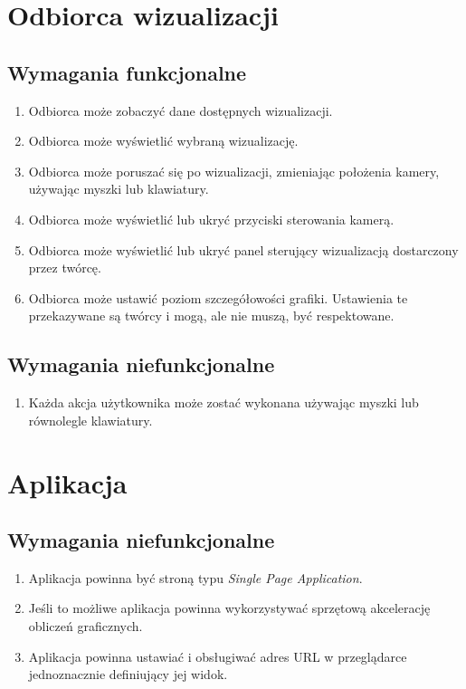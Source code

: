 \section{Odbiorca wizualizacji}

\subsection{Wymagania funkcjonalne}
\begin{enumerate}
    \item Odbiorca może zobaczyć dane dostępnych wizualizacji.
    \item Odbiorca może wyświetlić wybraną wizualizację.
    \item Odbiorca może poruszać się po wizualizacji, zmieniając położenia kamery, używając myszki lub klawiatury.
    \item Odbiorca może wyświetlić lub ukryć przyciski sterowania kamerą.
    \item Odbiorca może wyświetlić lub ukryć panel sterujący wizualizacją dostarczony przez twórcę.
    \item Odbiorca może ustawić poziom szczegółowości grafiki. Ustawienia te przekazywane są twórcy i mogą, ale nie muszą, być respektowane.
\end{enumerate}
\subsection{Wymagania niefunkcjonalne}
\begin{enumerate}
    \item Każda akcja użytkownika może zostać wykonana używając myszki lub równolegle klawiatury.
\end{enumerate}

\section{Aplikacja}

\subsection{Wymagania niefunkcjonalne}
\begin{enumerate}
    \item Aplikacja powinna być stroną typu \textit{Single Page Application}. %
    \item Jeśli to możliwe aplikacja powinna wykorzystywać sprzętową akcelerację obliczeń graficznych.
    \item Aplikacja powinna ustawiać i obsługiwać adres URL w przeglądarce jednoznacznie definiujący jej widok.
\end{enumerate}


